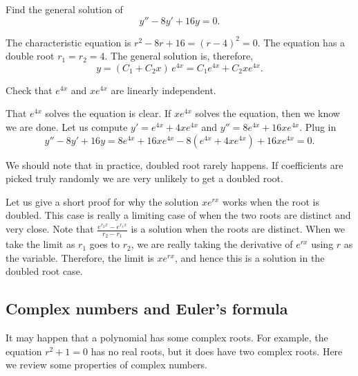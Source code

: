 \begin{example}
Find the general solution of
\begin{equation*}
y'' -8 y' + 16 y = 0 .
\end{equation*}

The characteristic equation is $r^2 - 8 r + 16 = {(r-4)}^2 = 0$.
The equation has a 
double root $r_1 = r_2 = 4$.  The general solution is, therefore,
\begin{equation*}
y = (C_1 + C_2 x)\, e^{4 x} = C_1 e^{4x} + C_2 x e^{4x} .
\end{equation*}

\begin{exercise}
Check that $e^{4x}$ and $x e^{4x}$ are linearly independent.
\end{exercise}

That $e^{4x}$ solves the equation is clear.  If $x e^{4x}$ solves the
equation, then we know we are done.  Let us compute
$y' = e^{4x} + 4xe^{4x}$ and
$y'' = 8 e^{4x} + 16xe^{4x}$.  Plug in
\begin{equation*}
y'' - 8 y' + 16 y = 
8 e^{4x} + 16xe^{4x} - 8(e^{4x} + 4xe^{4x}) + 16 xe^{4x} = 
0 .
\end{equation*}
\end{example}

We should note that in practice, doubled root rarely happens.  If
coefficients are 
picked truly randomly we are very unlikely to get a doubled root.

Let us give a short proof for why the solution $x e^{r x}$ works when the
root is doubled.  This case is really a limiting case of when
the two roots are distinct and very close.  Note that 
$\frac{e^{r_2 x} - e^{r_1 x}}{r_2 - r_1}$ is a solution when the roots are
distinct.  When we take the limit as $r_1$ goes to $r_2$, we are really
taking the
derivative of $e^{rx}$ using $r$ as the variable.  Therefore, the limit is 
$x e^{rx}$, and hence this is a solution in the doubled root case.

\subsection{Complex numbers and Euler's formula}

It may happen that a polynomial has some complex roots.  For example, the
equation $r^2 + 1 = 0$ has no real roots, but it does have two complex roots.
Here we review some properties of complex numbers.

\medskip

